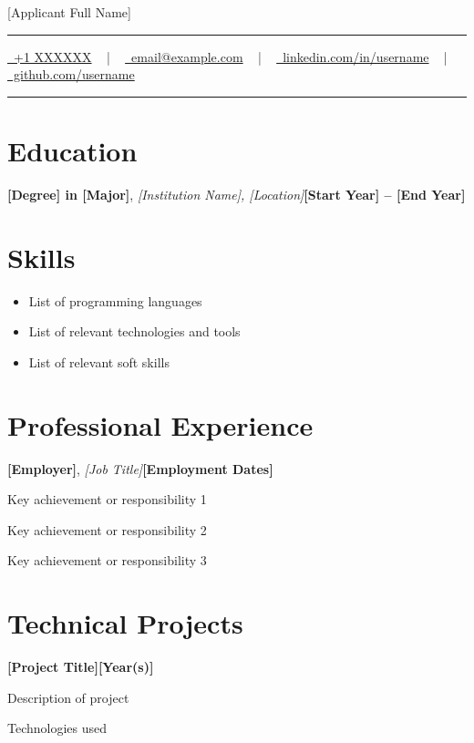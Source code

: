 \documentclass[letterpaper,10pt]{article}
\newcommand{\documentTitle}[2]{
  \begin{center}
    {\Huge\color{accentTitle} #1}
    \vspace{10pt}
    {\color{accentLine} \hrule}
    \vspace{2pt}
    \footnotesize{#2}
    \vspace{2pt}
    {\color{accentLine} \hrule}
  \end{center}
}
\newcommand{\heading}[2]{
  \hspace{10pt}#1\hfill#2\\
}
\newcommand{\headingBf}[2]{
  \heading{\textbf{#1}}{\textbf{#2}}
}
\newcommand{\headingBfIt}[3]{
  \heading{\textbf{#2}, \textit{#1}}{\textbf{#3}}
}
\newenvironment{resume_list}{
  \vspace{-7pt}
  \begin{itemize}[itemsep=-2px, parsep=1pt, leftmargin=30pt]
}{
  \end{itemize}
}
\begin{document}
\documentTitle{[Applicant Full Name]}{
    \href{tel:+1XXXXXX}{
      \raisebox{-0.05\height} \faPhone\ +1 XXXXXX} ~ | ~
    \href{mailto:email@example.com}{
      \raisebox{-0.15\height} \faEnvelope\ email@example.com} ~ | ~
    \href{https://www.linkedin.com/in/username/}{
      \raisebox{-0.15\height} \faLinkedin\ linkedin.com/in/username} ~ | ~
    \href{https://github.com/username}{
      \raisebox{-0.15\height} \faGithub\ github.com/username}
}

\section{Education}

\headingBfIt{[Institution Name], [Location]}{[Degree] in [Major]}{[Start Year] -- [End Year]}

\section{Skills}
\begin{itemize}[itemsep=-2px, parsep=1pt, leftmargin=90pt]
        \item[\textbf{Programming Languages}] List of programming languages
        \item[\textbf{Technologies and Tools}] List of relevant technologies and tools
        \item[\textbf{Soft Skills}] List of relevant soft skills
\end{itemize}

\section{Professional Experience}

\headingBfIt{[Job Title]}{[Employer]}{[Employment Dates]}
\begin{resume_list}
    \item Key achievement or responsibility 1
    \item Key achievement or responsibility 2
    \item Key achievement or responsibility 3
\end{resume_list}

\section{Technical Projects}
\headingBf{[Project Title]}{[Year(s)]}
\begin{resume_list}
    \item Description of project
    \item Technologies used
\end{resume_list}
\end{document}
